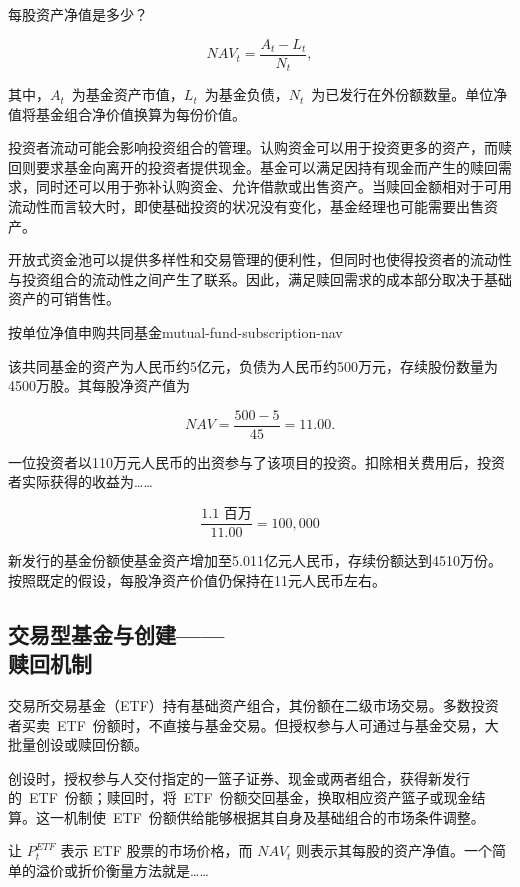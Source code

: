 每股资产净值是多少？

\begin{equation}
\textit{NAV}_t=
\frac{A_t-L_t}{N_t},
\label{eq:ch14-nav}
\end{equation}

其中，$A_t$~为基金资产市值，$L_t$~为基金负债，$N_t$~为已发行在外份额数量。单位净值将基金组合净价值换算为每份价值。

投资者流动可能会影响投资组合的管理。认购资金可以用于投资更多的资产，而赎回则要求基金向离开的投资者提供现金。基金可以满足因持有现金而产生的赎回需求，同时还可以用于弥补认购资金、允许借款或出售资产。当赎回金额相对于可用流动性而言较大时，即使基础投资的状况没有变化，基金经理也可能需要出售资产。

开放式资金池可以提供多样性和交易管理的便利性，但同时也使得投资者的流动性与投资组合的流动性之间产生了联系。因此，满足赎回需求的成本部分取决于基础资产的可销售性。

\begin{example}{按单位净值申购共同基金}{mutual-fund-subscription-nav}

该共同基金的资产为人民币约5亿元，负债为人民币约500万元，存续股份数量为4500万股。其每股净资产值为

\[
\textit{NAV}=\frac{500-5}{45}=11.00.
\]

一位投资者以110万元人民币的出资参与了该项目的投资。扣除相关费用后，投资者实际获得的收益为……

\[
\frac{1.1\text{ 百万}}{11.00}=100{,}000
\]

新发行的基金份额使基金资产增加至5.011亿元人民币，存续份额达到4510万份。按照既定的假设，每股净资产价值仍保持在11元人民币左右。

\end{example}

\subsection[交易所交易基金与创设赎回机制]{交易型基金与创建——\\赎回机制}

交易所交易基金（ETF）持有基础资产组合，其份额在二级市场交易。多数投资者买卖~ETF~份额时，不直接与基金交易。但授权参与人可通过与基金交易，大批量创设或赎回份额。

创设时，授权参与人交付指定的一篮子证券、现金或两者组合，获得新发行的~ETF~份额；赎回时，将~ETF~份额交回基金，换取相应资产篮子或现金结算。这一机制使~ETF~份额供给能够根据其自身及基础组合的市场条件调整。

让 $P_t^{ETF}$ 表示 ETF 股票的市场价格，而 $\textit{NAV}_t$ 则表示其每股的资产净值。一个简单的溢价或折价衡量方法就是……

